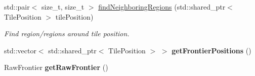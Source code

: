 \begin{DoxyCompactItemize}
std\+::pair$<$ size\+\_\+t, size\+\_\+t $>$ \hyperlink{classOverseer_1_1Map_af0b8210288ed4dfc7d68e5005614b4e3}{find\+Neighboring\+Regions} (std\+::shared\+\_\+ptr$<$ Tile\+Position $>$ tile\+Position)
\begin{DoxyCompactList}\small\item\em Find region/regions around tile position. \end{DoxyCompactList}\item 
std\+::vector$<$ std\+::shared\+\_\+ptr$<$ Tile\+Position $>$ $>$ {\bfseries get\+Frontier\+Positions} ()\hypertarget{classOverseer_1_1Map_aa7872066386c1a6d3ee262eb1054130d}{}\label{classOverseer_1_1Map_aa7872066386c1a6d3ee262eb1054130d}

\item 
Raw\+Frontier {\bfseries get\+Raw\+Frontier} ()\hypertarget{classOverseer_1_1Map_a7123e4389358218ad74ebce58680b6d2}{}\label{classOverseer_1_1Map_a7123e4389358218ad74ebce58680b6d2}

\end{DoxyCompactItemize}
